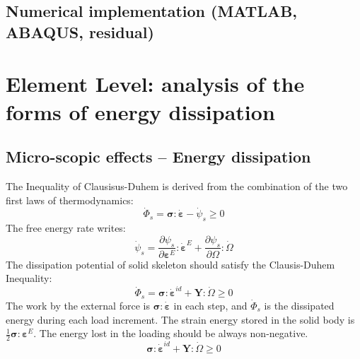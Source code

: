 \documentclass[preprint,review,12pt]{elsarticle}
\begin{document}
\subsection{Numerical implementation (MATLAB, ABAQUS, residual)}
\section{Element Level: analysis of the forms of energy dissipation}
\subsection{Micro-scopic effects -- Energy dissipation}
%
The Inequality of Clausisus-Duhem is derived from the combination of the two first laws of thermodynamics:
%
\begin{equation}
 \label{eq:ICD1}
  \dot\varPhi_s=\bm\sigma:\dot{\bm\varepsilon}-\dot{\psi}_s \ge 0
\end{equation}
%
The free energy rate writes:
%
\begin{equation}
\label{eq:ratefreeenergy}
    \dot{\psi}_s=\frac{\partial \psi_s}{\partial \bm\varepsilon^E}:\dot{\bm\varepsilon}^E
    + \frac{\partial \psi_s}{\partial \bm\varOmega}:\dot{\bm\varOmega}
\end{equation}
%
The dissipation potential of solid skeleton should satisfy the Clausis-Duhem Inequality:
%
\begin{equation}\label{ICD2}
   \dot\varPhi_s=\bm\sigma:\dot{\bm\varepsilon}^{id}+\bm{Y}:\dot{\bm\varOmega} \ge 0
\end{equation}
%
The work by the external force is $\bm\sigma:\dot{\bm\varepsilon}$ in each step, and $\dot\varPhi_s$ is the dissipated energy during each load increment. The strain energy stored in the solid body is $\frac{1}{2}\bm\sigma:\bm\varepsilon^E$. The energy lost in the loading should be always non-negative.
%
%
\begin{equation}\label{eq:ICD3}
   \bm\sigma:\dot{\bm\varepsilon}^{id}+\bm{Y}:\dot{\bm\varOmega} \ge 0
\end{equation}
\end{document}
